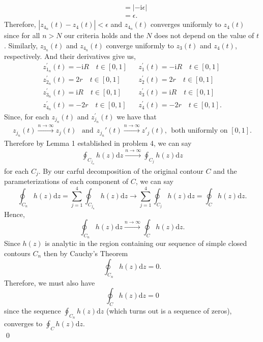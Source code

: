 \documentclass[10pt]{amsart}
\newcommand{\D}{\mathrm{d}}
\newcommand{\I}{\mathrm{i}}
\theoremstyle{nonumberplain}
\begin{document}
\begin{enumerate}[label={\bf {\arabic*}:}]
\begin{itemize}
\begin{align*}
	&= \left| - \I \epsilon \right| \\
	&= \epsilon.
\end{align*}
Therefore, $\left| z_{4_n}(t) - z_4(t) \right| < \epsilon$ and $z_{4_n}(t)$ converges uniformly to $z_4(t)$ since for all $n > N$ our criteria holds and the $N$ does not depend on the value of $t$.
Similarly, $z_{3_n}(t)$ and $z_{4_n}(t)$ converge uniformly to $z_3(t)$ and $z_4(t)$, respectively.
And their derivatives give us,
\begin{align*}
&z_{1_n}^\prime(t) = -\I R \quad t \in [0, 1]& &z_1^\prime(t) = -\I R \quad t \in [0, 1]& \\
&z_{2_n}^\prime(t) = 2r \quad t \in [0, 1]& &z_2^\prime(t) = 2r \quad t \in [0, 1]& \\
&z_{3_n}^\prime(t) = \I R \quad t \in [0, 1]& &z_3^\prime(t) = \I R \quad t \in [0, 1]& \\
&z_{4_n}^\prime(t) = - 2r \quad t \in [0, 1]& &z_4^\prime(t) = - 2r \quad t \in [0, 1].&
\end{align*}
Since, for each $z_{j_n}(t)$ and $z_{j_n}^\prime(t)$ we have that
\begin{align*}
	z_{j_n}(t) \overset{n \to \infty}{\longrightarrow} z_j(t)  \:\: \text{ and} \:\:
	z_{j_n}'(t) \overset{n \to \infty}{\longrightarrow} z'_j(t), \:\: \text{both uniformly on } [0,1].
\end{align*}
Therefore by Lemma 1 established in problem 4, we can say
\begin{align*}
\oint_{C_{j_n}}h(z)\D z \overset{n \to \infty}{\longrightarrow} \oint_{C_j}h(z)\D z
\end{align*}
for each $C_j$.
By our carful decomposition of the original contour $C$ and the parameterizations of each component of $C$, we can say 
$$\oint_{C_n} h(z) \D z = \sum_{j = 1}^{4} \oint_{C_{j_n}}h(z) \D z \rightarrow \sum_{j = 1}^{4} \oint_{C_j}h(z) \D z = \oint_{C}h(z)\D z.$$
Hence,
$$\oint_{C_n}h(z)\D z \overset{n \to \infty}{\longrightarrow} \oint_{C}h(z)\D z.$$
Since $h(z)$ is analytic in the region containing our sequence of simple closed contours $C_n$ then by Cauchy's Theorem
$$
\oint_{C_n}h(z)\D z = 0.
$$
Therefore, we must also have
$$\oint_{C}h(z)\D z = 0$$
since the sequence $\oint_{C_n}h(z)\D z$ (which turns out is a sequence of zeros), converges to $\oint_{C}h(z)\D z$. \\
\qed \\


\end{itemize}
\end{enumerate}
\end{document}

